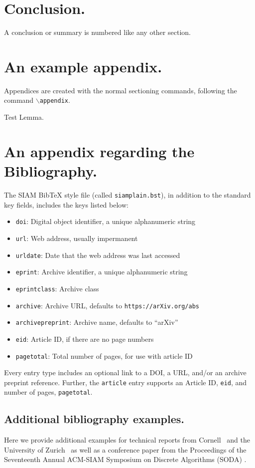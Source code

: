 \documentclass[twoside,leqno,twocolumn]{article}
\begin{document}
\section{Conclusion.}
A conclusion or summary is numbered like any other section.

\appendix
\section{An example appendix.} 
Appendices are created with the normal sectioning commands, following
the command $\backslash$\texttt{appendix}. 

\begin{lemma}
Test Lemma.
\end{lemma}

\section{An appendix regarding the Bibliography.}
\label{sec:bib}
The SIAM BibTeX style file (called \texttt{siamplain.bst}), in addition to the
standard key fields, includes the keys listed below:
\begin{itemize}[nosep]
\item \texttt{doi}: Digital object identifier, a unique alphanumeric string
\item \texttt{url}: Web address, usually impermanent
\item \texttt{urldate}: Date that the web address was last accessed
\item \texttt{eprint}: Archive identifier, a unique alphanumeric string
\item \texttt{eprintclass}: Archive class
\item \texttt{archive}: Archive URL, defaults to \nolinkurl{https://arXiv.org/abs}
\item \texttt{archivepreprint}: Archive name, defaults to ``arXiv''
\item \texttt{eid}: Article ID, if there are no page numbers
\item \texttt{pagetotal}: Total number of pages, for use with article ID
\end{itemize}
Every entry type includes an optional link to a DOI, a URL, and/or an archive 
preprint reference. Further, the \texttt{article} entry supports an Article ID, 
\texttt{eid}, and number of pages, \texttt{pagetotal}.

\subsection{Additional bibliography examples.}
Here we provide additional examples for technical reports from Cornell~\cite{Chew1989} and the University of Zurich~\cite{instance1290}
as well as a conference paper from the Proceedings of the Seventeenth Annual ACM-SIAM Symposium on Discrete Algorithms
(SODA) \cite{Aggarwal06}.
\end{document}
